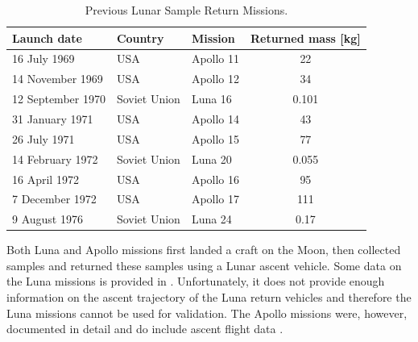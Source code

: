 \begin{table}[!ht]
\begin{center}
\caption{Previous Lunar Sample Return Missions.}
\label{tab:prevmis}
\begin{tabular}{|l|l|l|c|}
\hline 
\textbf{Launch date} 		& \textbf{Country} & \textbf{Mission} & \textbf{Returned mass [kg]} \\ \hline \hline
16 July 1969 		& USA & Apollo 11 & 22  \\ \hline
14 November 1969 		& USA & Apollo 12 & 34  \\ \hline
12 September 1970 		& Soviet Union & Luna 16 & 0.101  \\ \hline
31 January 1971 		& USA & Apollo 14 & 43  \\ \hline
26 July 1971 		& USA & Apollo 15 & 77 \\ \hline
14 February 1972 		& Soviet Union & Luna 20 & 0.055  \\ \hline
16 April 1972 		& USA & Apollo 16 & 95  \\ \hline
7 December 1972 		& USA & Apollo 17 & 111  \\ \hline
9 August 1976 		& Soviet Union & Luna 24 & 0.17  \\ \hline
\end{tabular}
\end{center}
\end{table}

Both Luna and Apollo missions first landed a craft on the Moon, then collected samples and returned these samples using a Lunar ascent vehicle. Some data on the Luna missions is provided in \cite{harvey2007soviet}. Unfortunately, it does not provide enough information on the ascent trajectory of the Luna return vehicles and therefore the Luna missions cannot be used for validation. The Apollo missions were, however, documented in detail and do include ascent flight data \cite{apollo1971}.\\
%
%


